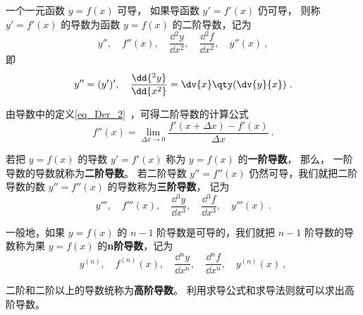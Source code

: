 

一个一元函数 $y=f(x)$ 可导， 如果导函数 $y'=f'(x)$ 仍可导， 则称 $y'=f'(x)$ 的导数为函数 $y=f(x)$ 的二阶导数，记为
\begin{equation}
y'',\quad f''(x),\quad \frac{\dd{^2y}}{\dd{x^2}},\quad \frac{\dd{^2f}}{\dd{x^2}},\quad y''(x)~,
\end{equation}
即
\begin{equation}
y''=(y')',\quad\frac{\dd{^2y}}{\dd{x^2}}=\dv{x}\qty(\dv{y}{x})~.
\end{equation}

由导数中的定义\autoref{eq_Der_2}~，可得二阶导数的计算公式
\begin{equation}
f''(x)=\lim_{\Delta x \to 0} \frac{f'(x+ \Delta x)-f'(x)}{\Delta x}~.
\end{equation}

若把 $y=f(x)$ 的导数 $y'=f'(x)$ 称为 $y=f(x)$ 的\textbf{一阶导数}， 那么， 一阶导数的导数就称为\textbf{二阶导数}。 若二阶导数 $y''=f''(x)$ 仍然可导，我们就把二阶导数的数 $y''=f''(x)$ 的导数称为\textbf{三阶导数}， 记为
\begin{equation}
y''',\quad f'''(x),\quad \frac{\dd{^3y}}{\dd{x^3}},\quad \frac{\dd{^3f}}{\dd{x^3}},\quad y'''(x)~.
\end{equation}

一般地，如果 $y=f(x)$ 的 $n-1$ 阶导数是可导的，我们就把 $n-1$ 阶导数的导数称为果 $y=f(x)$ 的\textbf{n阶导数}，记为
\begin{equation}
y^{(n)},\quad f^{(n)}(x),\quad \frac{\dd{^ny}}{\dd{x^n}},\quad \frac{\dd{^nf}}{\dd{x^n}},\quad y^{(n)}(x)~,
\end{equation}

二阶和二阶以上的导数统称为\textbf{高阶导数}。 利用求导公式和求导法则就可以求出高阶导数。


